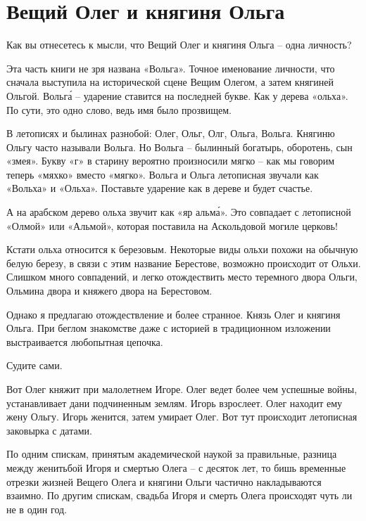 \chapter{Вещий Олег и княгиня Ольга}

Как вы отнесетесь к мысли, что Вещий Олег и княгиня Ольга – одна личность?

Эта часть книги не зря названа «Вольга». Точное именование личности, что сначала выступила на исторической сцене Вещим Олегом, а затем  княгиней Ольгой. Вольг\'а – ударение ставится на последней букве. Как у дерева «ольха». По сути, это одно слово, ведь имя было прозвищем.

В летописях и былинах разнобой: Олег, Ольг, Олг, Ольга, Вольга. Княгиню Ольгу часто называли Вольга. Но Вольга – былинный богатырь, оборотень, сын «змея». Букву «г» в старину вероятно произносили мягко – как мы говорим теперь «мяхко» вместо «мягко». Вольга и Ольга летописная звучали как «Вольха» и «Ольха». Поставьте ударение как в дереве и будет счастье.

А на арабском дерево ольха звучит как «яр альм\'а». Это совпадает с летописной «Олмой» или «Альмой», которая поставила на Аскольдовой могиле церковь!

Кстати ольха относится к березовым. Некоторые виды ольхи похожи на обычную белую березу, в связи с этим название Берестове, возможно происходит от Ольхи. Слишком много совпадений, и легко отождествить место теремного двора Ольги, Ольмина двора и княжего двора на Берестовом.


Однако я предлагаю отождествление и более странное. Князь Олег и княгиня Ольга. При беглом знакомстве даже с историей в традиционном изложении выстраивается любопытная цепочка.

Судите сами.

Вот Олег княжит при малолетнем Игоре. Олег ведет более чем успешные войны, устанавливает дани подчиненным землям. Игорь взрослеет. Олег находит ему жену Ольгу. Игорь женится, затем умирает Олег. Вот тут происходит летописная заковырка с датами. 

По одним спискам, принятым академической наукой за правильные, разница между женитьбой Игоря и смертью Олега – с десяток лет, то бишь временные отрезки жизней Вещего Олега и княгини Ольги частично накладываются взаимно. По другим спискам, свадьба Игоря и смерть Олега происходят чуть ли не в один год.

